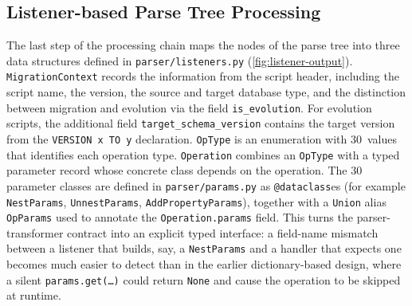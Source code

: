   \subsection{Listener-based Parse Tree Processing}\label{subsec:listeners}

  The last step of the processing chain maps the nodes of the parse tree into three data structures defined
  in \texttt{parser/listeners.py} (\autoref{fig:listener-output}).
  \texttt{MigrationContext} records the information from the script header, including the script name, the version, the source and target database type, and the distinction between migration and evolution via the field
  \texttt{is\_evolution}. For evolution scripts, the additional field
  \texttt{target\_schema\_version} contains the target version from the
  \texttt{VERSION x TO y} declaration. \texttt{OpType} is an enumeration
  with 30~values that identifies each operation type. \texttt{Operation}
  combines an \texttt{OpType} with a typed parameter record whose concrete
  class depends on the operation. The 30 parameter classes are defined in
  \texttt{parser/params.py} as \texttt{@dataclass}es (for example
  \texttt{NestParams}, \texttt{UnnestParams}, \texttt{AddPropertyParams}),
  together with a \texttt{Union} alias \texttt{OpParams} used to annotate
  the \texttt{Operation.params} field. This turns the parser-transformer
  contract into an explicit typed interface: a field-name mismatch
  between a listener that builds, say, a \texttt{NestParams} and a handler
  that expects one becomes much easier to detect than in the earlier
  dictionary-based design, where a silent \texttt{params.get(\ldots)}
  could return \texttt{None} and cause the operation to be skipped at runtime.

